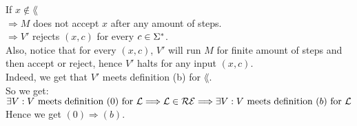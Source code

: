 If $x \notin \lang$ \\
$\Longrightarrow M$ does not accept $x$ after any amount of steps. \\
$\Longrightarrow V'$ rejects $(x, c)$ for every $c \in \Sigma^*$. \\

Also, notice that for every $(x, c)$, $V'$ will run $M$ for finite amount of steps and \\
then accept or reject, hence $V'$ halts for any input $(x, c)$. \\

Indeed, we get that $V'$ meets definition (b) for $\lang$. \\
So we get: \\
$\exists V: V \text{ meets definition } (0) \text{ for } \mathcal{L} \Longrightarrow \mathcal{L} \in \mathcal{R}\mathcal{E} \Longrightarrow \exists V: V \text{ meets definition } (b) \text{ for } \mathcal{L}$ \\
Hence we get $(0) \Rightarrow (b)$. \\
